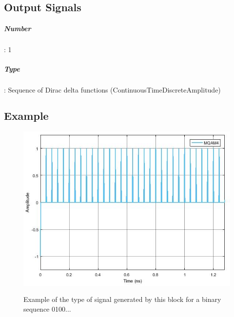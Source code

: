 \subsection*{Output Signals}

\subparagraph*{Number}: 1

\subparagraph*{Type}: Sequence of Dirac delta functions (ContinuousTimeDiscreteAmplitude)

\subsection*{Example}

\begin{figure}[h]
	\centering
	\includegraphics[width=\textwidth]{../lib/discrete_to_continuous_time/figures/TimeDiscreteToContinuous_output}
	\label{MQAM4_DeterministicAppendZeros}\caption{Example of the type of signal generated by this block for a binary sequence 0100...}
\end{figure}


\pagebreak

